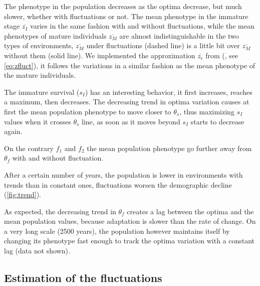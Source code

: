The phenotype in the population decreases as the optima decrease, but much slower, whether with fluctuations or not. The mean phenotype in the immature stage $\overline{z_I}$ varies in the same fashion with and without fluctuations, while the mean phenotypes of mature individuals $\overline{z_M}$ are almost indistinguishable in the two types of environments, $\overline{z_M}$ under fluctuations (dashed line) is a little bit over $\overline{z_M}$ without them (solid line). We implemented the approximation $\overline{z_\epsilon}$ from (\citealt{engen_evolution_2011}, see \autoref{eq:zfluct}), it follows the variations in a similar fashion as the mean phenotype of the mature individuals.

The immature survival ($s_I$) has an interesting behavior, it first increases, reaches a maximum, then decreases. The decreasing trend in optima variation causes at first the mean population phenotype to move closer to $\theta_s$, thus maximizing $s_I$ values when it crosses $\theta_s$ line, as soon as it moves beyond $s_I$ starts to decrease again.

On the contrary $f_1$ and $f_2$ the mean population phenotype go further away from $\theta_f$ with and without fluctuation.

After a certain number of years, the population is lower in environments with trends than in constant ones, fluctuations worsen the demographic decline (\autoref{fig:trend}). 

As expected, the decreasing trend in $\theta_f$ creates a lag between the optima and the mean population values, because adaptation is slower than the rate of change. On a very long scale (2500 years), the population however maintains itself by changing its phenotype fast enough to track the optima variation with a constant lag (data not shown).

\subsection*{Estimation of the fluctuations}

